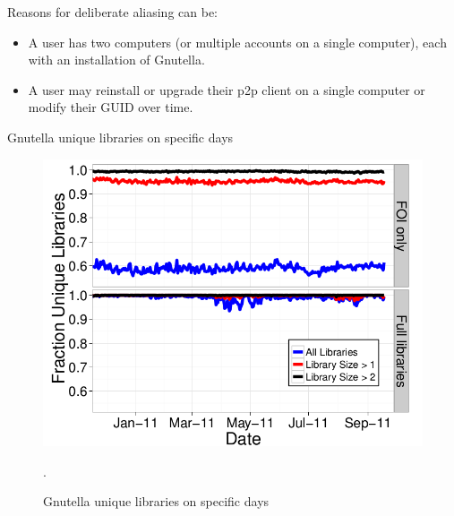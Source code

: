 \documentclass[notes]{beamer}
\begin{document}
\begin{frame}

\begin{block}{Reasons for deliberate aliasing can be:}

\begin{itemize}

\item[\checkmark]A user has two computers (or multiple
accounts on a single computer), each with an installation
of Gnutella.

\item[\checkmark]A user may reinstall or upgrade their p2p client on a single computer or modify their GUID over time.

\end{itemize}

\end{block}

\end{frame}

\begin{frame}

\begin{block}{Gnutella unique libraries on specific days}

\begin{figure}[!htb]
\centering
\includegraphics[scale=0.3]{Libraries_specific_day}
\caption{Gnutella unique libraries on specific days}.
\label{fig:Libraries_specific_day}
\end{figure}

\end{block}

\end{frame}
\end{document}
